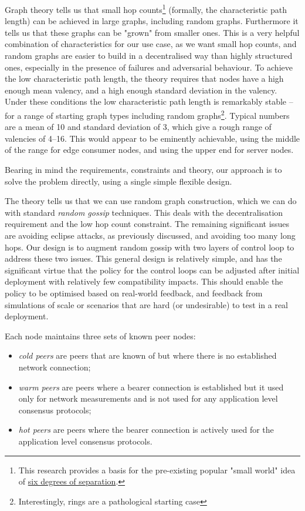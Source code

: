 \documentclass[11pt,a4paper]{article}
\begin{document}
Graph theory \cite{Watts99} tells us that small hop counts\footnote{This
  research provides a basis for the pre-existing popular "small world"
  idea of
  \href{https://en.wikipedia.org/wiki/Six_degrees_of_separation\#Computer_networks}{{six
  degrees of separation}}.} (formally, the characteristic path length)
can be achieved in large graphs, including random graphs. Furthermore it
tells us that these graphs can be "grown" from smaller ones. This is a
very helpful combination of characteristics for our use case, as we want
small hop counts, and random graphs are easier to build in a
decentralised way than highly structured ones, especially in the
presence of failures and adversarial behaviour. To achieve the low
characteristic path length, the theory requires that nodes have a high
enough mean valency, and a high enough standard deviation in the
valency. Under these conditions the low characteristic path length is
remarkably stable -- for a range of starting graph types including
random graphs\footnote{Interestingly, rings are a pathological starting
  case}. Typical numbers are a mean of 10 and standard deviation of 3,
which give a rough range of valencies of 4--16. This would appear to be
eminently achievable, using the middle of the range for edge consumer
nodes, and using the upper end for server nodes.

Bearing in mind the requirements, constraints and theory, our approach
is to solve the problem directly, using a single simple flexible design.

The theory tells us that we can use random graph construction, which we
can do with standard \emph{random gossip} techniques. This deals with
the decentralisation requirement and the low hop count constraint. The
remaining significant issues are avoiding eclipse attacks, as previously
discussed, and avoiding too many long hops. Our design is to augment
random gossip with two layers of control loop to address these two
issues. This general design is relatively simple, and has the
significant virtue that the policy for the control loops can be adjusted
after initial deployment with relatively few compatibility impacts. This
should enable the policy to be optimised based on real-world feedback,
and feedback from simulations of scale or scenarios that are hard (or
undesirable) to test in a real deployment.

Each node maintains three sets of known peer nodes:

\begin{itemize}
\item
  \emph{cold peers} are peers that are known of but where there is no
  established network connection;
\item
  \emph{warm peers} are peers where a bearer connection is established
  but it used only for network measurements and is not used for any
  application level consensus protocols;
\item
  \emph{hot peers} are peers where the bearer connection is actively
  used for the application level consensus protocols.
\end{itemize}
\end{document}

